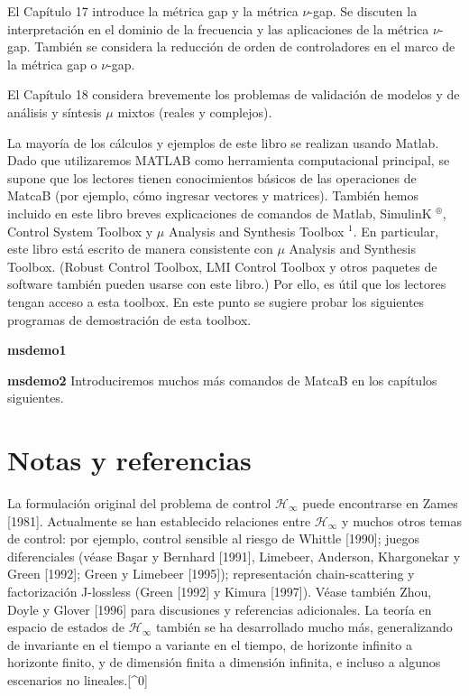El Capítulo 17 introduce la métrica gap y la métrica $\nu$-gap. Se discuten la interpretación en el dominio de la frecuencia y las aplicaciones de la métrica $\nu$-gap. También se considera la reducción de orden de controladores en el marco de la métrica gap o $\nu$-gap.

El Capítulo 18 considera brevemente los problemas de validación de modelos y de análisis y síntesis $\mu$ mixtos (reales y complejos).

La mayoría de los cálculos y ejemplos de este libro se realizan usando Matlab. Dado que utilizaremos MATLAB como herramienta computacional principal, se supone que los lectores tienen conocimientos básicos de las operaciones de MatcaB (por ejemplo, cómo ingresar vectores y matrices). También hemos incluido en este libro breves explicaciones de comandos de Matlab, SimulinK ${ }^{\circledR}$, Control System Toolbox y $\mu$ Analysis and Synthesis Toolbox ${ }^{1}$. En particular, este libro está escrito de manera consistente con $\mu$ Analysis and Synthesis Toolbox. (Robust Control Toolbox, LMI Control Toolbox y otros paquetes de software también pueden usarse con este libro.) Por ello, es útil que los lectores tengan acceso a esta toolbox. En este punto se sugiere probar los siguientes programas de demostración de esta toolbox.

\textbf{msdemo1}

\textbf{msdemo2}
Introduciremos muchos más comandos de MatcaB en los capítulos siguientes.

\section{Notas y referencias}
La formulación original del problema de control $\mathcal{H}_{\infty}$ puede encontrarse en Zames [1981]. Actualmente se han establecido relaciones entre $\mathcal{H}_{\infty}$ y muchos otros temas de control: por ejemplo, control sensible al riesgo de Whittle [1990]; juegos diferenciales (véase Başar y Bernhard [1991], Limebeer, Anderson, Khargonekar y Green [1992]; Green y Limebeer [1995]); representación chain-scattering y factorización J-lossless (Green [1992] y Kimura [1997]). Véase también Zhou, Doyle y Glover [1996] para discusiones y referencias adicionales. La teoría en espacio de estados de $\mathcal{H}_{\infty}$ también se ha desarrollado mucho más, generalizando de invariante en el tiempo a variante en el tiempo, de horizonte infinito a horizonte finito, y de dimensión finita a dimensión infinita, e incluso a algunos escenarios no lineales.[\^{}0]

